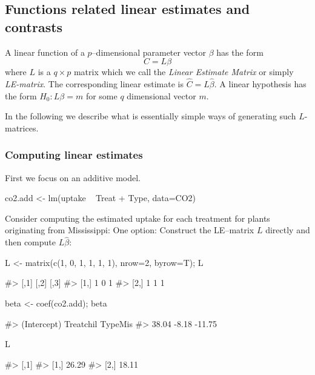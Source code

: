 \hypertarget{functions-related-linear-estimates-and-contrasts}{%
\subsection{Functions related linear estimates and
contrasts}\label{functions-related-linear-estimates-and-contrasts}}

A linear function of a \(p\)--dimensional parameter vector \(\beta\) has
the form \begin{displaymath}
  C=L\beta
\end{displaymath} where \(L\) is a \(q\times p\) matrix which we call
the \emph{Linear Estimate Matrix} or simply \emph{LE-matrix}. The
corresponding linear estimate is \(\hat C = L \hat \beta\). A linear
hypothesis has the form \(H_0: L\beta=m\) for some \(q\) dimensional
vector \(m\).

In the following we describe what is essentially simple ways of
generating such \(L\)-matrices.

\hypertarget{computing-linear-estimates}{%
\subsubsection{Computing linear
estimates}\label{computing-linear-estimates}}

First we focus on an additive model.

\begin{Schunk}
\begin{Sinput}
co2.add <- lm(uptake ~ Treat + Type, data=CO2)
\end{Sinput}
\end{Schunk}

Consider computing the estimated uptake for each treatment for plants
originating from Mississippi: One option: Construct the LE--matrix \(L\)
directly and then compute \(L\hat\beta\):

\begin{Schunk}
\begin{Sinput}
L <- matrix(c(1, 0, 1, 
              1, 1, 1), nrow=2, byrow=T); L
\end{Sinput}
\begin{Soutput}
#>      [,1] [,2] [,3]
#> [1,]    1    0    1
#> [2,]    1    1    1
\end{Soutput}
\begin{Sinput}
beta <- coef(co2.add); beta
\end{Sinput}
\begin{Soutput}
#> (Intercept)   Treatchil     TypeMis 
#>       38.04       -8.18      -11.75
\end{Soutput}
\begin{Sinput}
L %
\end{Sinput}
\begin{Soutput}
#>       [,1]
#> [1,] 26.29
#> [2,] 18.11
\end{Soutput}
\end{Schunk}

